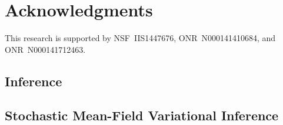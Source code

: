\documentclass[sigconf]{acmart}
\begin{document}
\section*{Acknowledgments}
This research is supported by NSF~IIS1447676, ONR~N000141410684, and ONR~N000141712463.


 

\clearpage

\begin{appendices}

\renewcommand{\theequation}{\Alph{section}.\arabic{equation}}
\onecolumn

\section{Inference}
\subsection{Stochastic Mean-Field Variational Inference}


\end{appendices}
\end{document}

